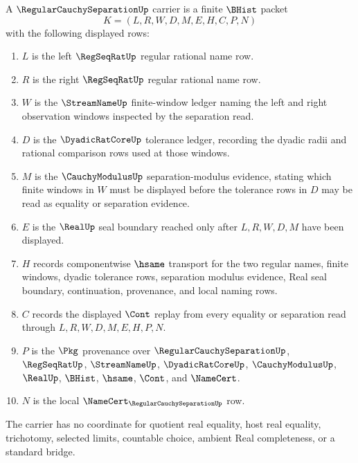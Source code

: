 \begin{definition}
\label{def:regular-cauchy-separation-carrier}
A $\RegularCauchySeparationUp$ carrier is a finite $\BHist$ packet
$$
K=(L,R,W,D,M,E,H,C,P,N)
$$
with the following displayed rows:
\begin{enumerate}
\item $L$ is the left $\RegSeqRatUp$ regular rational name row.
\item $R$ is the right $\RegSeqRatUp$ regular rational name row.
\item $W$ is the $\StreamNameUp$ finite-window ledger naming the left and right observation windows inspected by the separation read.
\item $D$ is the $\DyadicRatCoreUp$ tolerance ledger, recording the dyadic radii and rational comparison rows used at those windows.
\item $M$ is the $\CauchyModulusUp$ separation-modulus evidence, stating which finite windows in $W$ must be displayed before the tolerance rows in $D$ may be read as equality or separation evidence.
\item $E$ is the $\RealUp$ seal boundary reached only after $L,R,W,D,M$ have been displayed.
\item $H$ records componentwise $\hsame$ transport for the two regular names, finite windows, dyadic tolerance rows, separation modulus evidence, Real seal boundary, continuation, provenance, and local naming rows.
\item $C$ records the displayed $\Cont$ replay from every equality or separation read through $L,R,W,D,M,E,H,P,N$.
\item $P$ is the $\Pkg$ provenance over $\RegularCauchySeparationUp$, $\RegSeqRatUp$, $\StreamNameUp$, $\DyadicRatCoreUp$, $\CauchyModulusUp$, $\RealUp$, $\BHist$, $\hsame$, $\Cont$, and $\NameCert$.
\item $N$ is the local $\NameCert_{\RegularCauchySeparationUp}$ row.
\end{enumerate}
The carrier has no coordinate for quotient real equality, host real equality, trichotomy, selected limits, countable choice, ambient Real completeness, or a standard bridge.
\end{definition}

